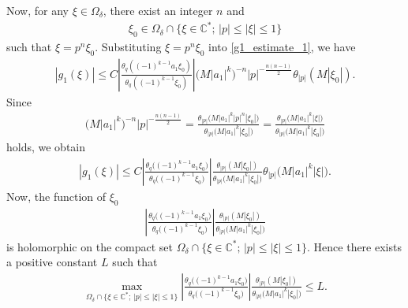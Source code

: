 Now, for any $\xi \in\Omega_\delta$, there exist an integer $n$ and
\begin{gather*}
\xi_0\in\Omega_\delta \cap\{\xi\in\mathbb{C}^* ;\,|p|\le|\xi|\le1\}
\end{gather*}
such that $\xi=p^n\xi_0$.
Substituting $\xi=p^n\xi_0$ into \eqref{g1_estimate_1}, we have
\begin{gather*}
|g_1(\xi)|\le C\left|\frac{\theta_q((-1)^{k-1}a_1\xi_0)}{\theta_q((-1)^{k-1}\xi_0)}\right|\big(M|a_1|^k\big)^{-n}|p|^{-\frac{n(n-1)}{2}}\theta_{|p|}(M|\xi_0|).
\end{gather*}
Since
\begin{gather*}
\big(M|a_1|^k\big)^{-n}|p|^{-\frac{n(n-1)}{2}}=\frac{\theta_{|p|}\big(M|a_1|^k|p|^n|\xi_0|\big)}{\theta_{|p|}\big(M|a_1|^k|\xi_0|\big)}=\frac{\theta_{|p|}\big(M|a_1|^k|\xi|\big)}{\theta_{|p|}\big(M|a_1|^k|\xi_0|\big)}
\end{gather*}
holds, we obtain
\begin{gather*}
|g_1(\xi)|\le C\left|\frac{\theta_q\big((-1)^{k-1}a_1\xi_0\big)}{\theta_q\big((-1)^{k-1}\xi_0\big)}\right|\frac{\theta_{|p|}(M|\xi_0|)}{\theta_{|p|}\big(M|a_1|^k|\xi_0|\big)}\theta_{|p|}\big(M|a_1|^k|\xi|\big).
\end{gather*}
Now, the function of $\xi_0$
\begin{gather*}
\left|\frac{\theta_q\big((-1)^{k-1}a_1\xi_0\big)}{\theta_q\big((-1)^{k-1}\xi_0\big)}\right|\frac{\theta_{|p|}(M|\xi_0|)}{\theta_{|p|}\big(M|a_1|^k|\xi_0|\big)}
\end{gather*}
is holomorphic on the compact set $\Omega_\delta \cap\{\xi\in\mathbb{C}^* ;\,|p|\le|\xi|\le1\}$. Hence there exists a positive constant $L$ such that
\begin{gather*}
\max_{\Omega_\delta \cap\{\xi\in\mathbb{C}^* ;\,|p|\le|\xi|\le1\}}\left|\frac{\theta_q\big((-1)^{k-1}a_1\xi_0\big)}{\theta_q\big((-1)^{k-1}\xi_0\big)}\right|\frac{\theta_{|p|}(M|\xi_0|)}{\theta_{|p|}\big(M|a_1|^k|\xi_0|\big)}\le L.
\end{gather*}

